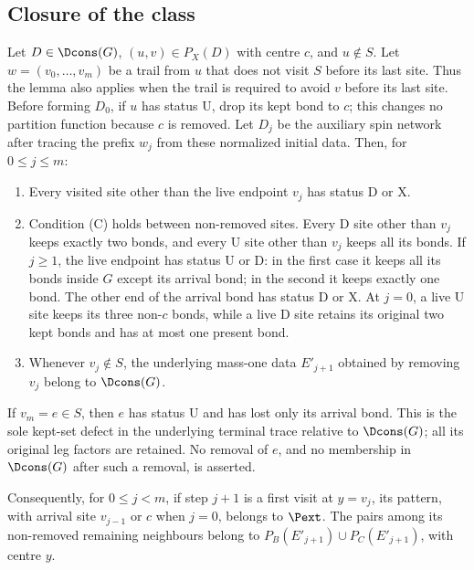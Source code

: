 \subsection{Closure of the class}\label{s:closure}

\begin{lemma}\label{l:closure}
Let $D\in\Dcons(G)$, $(u,v)\in P_X(D)$ with centre $c$, and
$u\notin S$. Let $w=(v_0,\dots,v_m)$ be a trail from $u$ that does
not visit $S$ before its last site. Thus the lemma also applies when
the trail is required to avoid $v$ before its last site. Before forming
$D_0$, if $u$ has status $\mathrm U$, drop its kept bond to $c$;
this changes no partition function because $c$ is removed. Let $D_j$
be the auxiliary spin network after tracing the prefix $w_j$ from
these normalized initial data. Then, for $0\le j\le m$:
\begin{enumerate}
\item Every visited site other than the live endpoint $v_j$ has
status $\mathrm D$ or $\mathrm X$.
\item Condition (C) holds between non-removed sites. Every
$\mathrm D$ site other than $v_j$ keeps exactly two bonds, and every
$\mathrm U$ site other than $v_j$ keeps all its bonds. If $j\ge1$,
the live endpoint has status $\mathrm U$ or $\mathrm D$: in the
first case it keeps all its bonds inside $G$ except its arrival bond;
in the second it keeps exactly one bond. The other end of the arrival
bond has status $\mathrm D$ or $\mathrm X$. At $j=0$, a live
$\mathrm U$ site keeps its three non-$c$ bonds, while a live
$\mathrm D$ site retains its original two kept bonds and has at most
one present bond.
\item Whenever $v_j\notin S$, the underlying mass-one data
$E'_{j+1}$ obtained by removing $v_j$ belong to $\Dcons(G)$.
\end{enumerate}
If $v_m=e\in S$, then $e$ has status $\mathrm U$ and has lost only
its arrival bond. This is the sole kept-set defect in the underlying
terminal trace relative to $\Dcons(G)$; all its original leg factors
are retained. No removal of $e$, and no membership in $\Dcons(G)$
after such a removal, is asserted.

Consequently, for $0\le j<m$, if step $j+1$ is a first visit at
$y=v_j$, its pattern, with arrival site $v_{j-1}$ or $c$ when
$j=0$, belongs to $\Pext$. The pairs among its non-removed remaining
neighbours belong to $P_B(E'_{j+1})\cup P_C(E'_{j+1})$, with
centre $y$.
\end{lemma}


